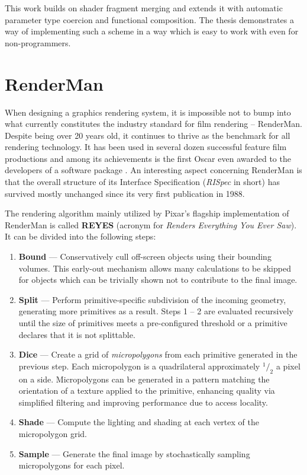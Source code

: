 This work builds on shader fragment merging and extends it with automatic parameter type coercion and functional composition. The thesis demonstrates a way of implementing such a scheme in a way which is easy to work with even for non-programmers.


\section{RenderMan}


When designing a graphics rendering system, it is impossible not to bump into what currently constitutes the industry standard for film rendering -- RenderMan. Despite being over 20 years old, it continues to thrive as the benchmark for all rendering technology. It has been used in several dozen successful feature film productions and among its achievements is the first Oscar even awarded to the developers of a software package \cite{RenderManAwards}. An interesting aspect concerning RenderMan is that the overall structure of its Interface Specification (\emph{RISpec} in short) has survived mostly unchanged since its very first publication in 1988.

The rendering algorithm mainly utilized by Pixar's flagship implementation of RenderMan is called \textbf{REYES} (acronym for \emph{Renders Everything You Ever Saw}). It can be divided into the following steps:
	
\begin{enumerate}
\item \textbf{Bound} --- Conservatively cull off-screen objects using their bounding volumes. This early-out mechanism allows many calculations to be skipped for objects which can be trivially shown not to contribute to the final image.
\item \textbf{Split} --- Perform primitive-specific subdivision of the incoming geometry, generating more primitives as a result. Steps 1 -- 2 are evaluated recursively until the size of primitives meets a pre-configured threshold or a primitive declares that it is not splittable.
\item \textbf{Dice} --- Create a grid of \emph{micropolygons} from each primitive generated in the previous step. Each micropolygon is a quadrilateral approximately $^1/_2$ a pixel on a side. Micropolygons can be generated in a pattern matching the orientation of a texture applied to the primitive, enhancing quality via simplified filtering and improving performance due to access locality.
\item \textbf{Shade} --- Compute the lighting and shading at each vertex of the micropolygon grid.
\item \textbf{Sample} --- Generate the final image by stochastically sampling micropolygons for each pixel.
\end{enumerate}

